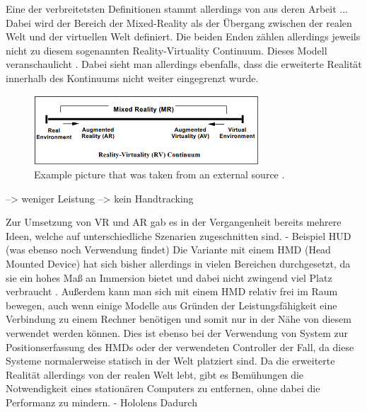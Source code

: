 	
	
	Eine der verbreitetsten Definitionen stammt allerdings von  aus deren Arbeit   ... Dabei wird der Bereich der Mixed-Reality als der Übergang zwischen der realen Welt und der virtuellen Welt definiert. Die beiden Enden zählen allerdings jeweils nicht zu diesem sogenannten Reality-Virtuality Continuum\cite{milgram}. Dieses Modell veranschaulicht . Dabei sieht man allerdings ebenfalls, dass die erweiterte Realität innerhalb des Kontinuums nicht weiter eingegrenzt wurde.
	
	\begin{figure}[htbp]
		\centering
		\includegraphics[width=0.75\textwidth]{figures/mixed_reality.png}
		\caption{Example picture that was taken from an external source .}
		\label{fig:mixed_reality}
	\end{figure}
	
	--> weniger Leistung
	--> kein Handtracking
	
	Zur Umsetzung von VR und AR gab es in der Vergangenheit bereits mehrere Ideen, welche auf unterschiedliche Szenarien zugeschnitten sind.
	- Beispiel HUD (was ebenso noch Verwendung findet)
	Die Variante mit einem HMD (Head Mounted Device) hat sich bisher allerdings in vielen Bereichen durchgesetzt, da sie ein hohes Maß an Immersion bietet und dabei nicht zwingend viel Platz verbraucht . Außerdem kann man sich mit einem HMD relativ frei im Raum bewegen, auch wenn einige Modelle aus Gründen der Leistungsfähigkeit eine Verbindung zu einem Rechner benötigen und somit nur in der Nähe von diesem verwendet werden können. Dies ist ebenso bei der Verwendung von System zur Positionserfassung des HMDs oder der verwendeten Controller der Fall, da diese Systeme normalerweise statisch in der Welt platziert sind. Da die erweiterte Realität allerdings von der realen Welt lebt, gibt es Bemühungen die Notwendigkeit eines stationären Computers zu entfernen, ohne dabei die Performanz zu mindern. - Hololens
	Dadurch 

